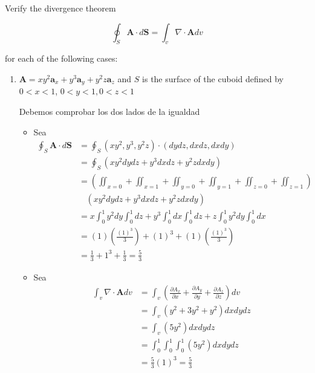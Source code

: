\begin{problema}

Verify the divergence theorem

$$
\oint_{S} \mathbf{A} \cdot d \mathbf{S}=\int_{v} \nabla \cdot \mathbf{A} d v
$$

for each of the following cases:

\begin{enumerate}
    \item $\mathbf{A}=x y^{2} \mathbf{a}_{x}+y^{3} \mathbf{a}_{y}+y^{2} z \mathbf{a}_{z}$ and $S$ is the surface of the cuboid defined by $0<x<1$, $0<y<1,0<z<1$
    \begin{sol}
        Debemos comprobar los dos lados de la igualdad 
        \begin{itemize}
            \item Sea
            \begin{align*}
                \oint_{S} \mathbf{A} \cdot d \mathbf{S} &= \oint_{S}\left(xy^2,y^3,y^2z\right)\cdot\left(dydz,dxdz,dxdy\right)\\
                &= \oint_{S}\left(xy^2dydz+y^3dxdz+y^2zdxdy\right)\\
                &= \left(\iint_{x=0}+\iint_{x=1}+\iint_{y=0}+\iint_{y=1}+\iint_{z=0}+\iint_{z=1}\right)\\
                &\ \ \ \  \left(xy^2dydz+y^3dxdz+y^2zdxdy\right)\\
                &=x\int_0^1y^2dy \int_{0}^{1}dz+y^3\int_{0}^{1}dx\int_{0}^{1}dz+z\int_0^1y^2dy \int_{0}^{1}dx\\
                &=(1)\left(\frac{(1)^3}{3}\right)+(1)^3+(1)\left(\frac{(1)^3}{3}\right)\\
                &= \frac{1}{3}+1^3+\frac{1}{3} = \frac{5}{3}
            \end{align*}
            \item Sea 
            \begin{align*}
                \int_{v} \nabla \cdot \mathbf{A} d v &=\int_{v} \left(\frac{\partial A_x}{\partial x}+\frac{\partial A_y}{\partial y}+\frac{\partial A_z}{\partial z}\right)dv\\
                &=\int_{v} \left(y^2+3y^2+y^2\right)dxdydz\\
                &=\int_v\left(5y^2\right)dxdydz\\
                &=\int_0^1\int_0^1\int_{0}^{1}\left(5y^2\right)dxdydz\\
                &=\frac{5}{3}(1)^3=\frac{5}{3}
            \end{align*}

\end{itemize}
\end{sol}
\end{enumerate}
\end{problema}
